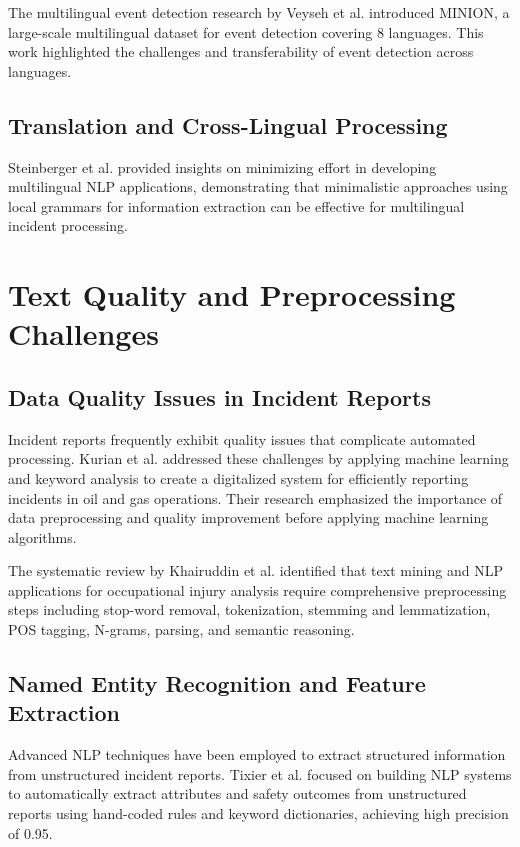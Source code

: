 \documentclass[11pt, titlepage, bibliography=totoc]{scrreprt}
\begin{document}
The multilingual event detection research by Veyseh et al. \cite{veyseh2022} introduced MINION, a large-scale multilingual dataset for event detection covering 8 languages. This work highlighted the challenges and transferability of event detection across languages.

\subsection{Translation and Cross-Lingual Processing}
Steinberger et al.\cite{steinberger2006} provided insights on minimizing effort in developing multilingual NLP applications, demonstrating that minimalistic approaches using local grammars for information extraction can be effective for multilingual incident processing.

\section{Text Quality and Preprocessing Challenges}

\subsection{Data Quality Issues in Incident Reports}
Incident reports frequently exhibit quality issues that complicate automated processing. Kurian et al. \cite{4_Kurian} addressed these challenges by applying machine learning and keyword analysis to create a digitalized system for efficiently reporting incidents in oil and gas operations. Their research emphasized the importance of data preprocessing and quality improvement before applying machine learning algorithms.

The systematic review by Khairuddin et al. \cite{khairuddin2022} identified that text mining and NLP applications for occupational injury analysis require comprehensive preprocessing steps including stop-word removal, tokenization, stemming and lemmatization, POS tagging, N-grams, parsing, and semantic reasoning.

\subsection{Named Entity Recognition and Feature Extraction}
Advanced NLP techniques have been employed to extract structured information from unstructured incident reports. Tixier et al. \cite{tixier2016} focused on building NLP systems to automatically extract attributes and safety outcomes from unstructured reports using hand-coded rules and keyword dictionaries, achieving high precision of 0.95.
\end{document}
